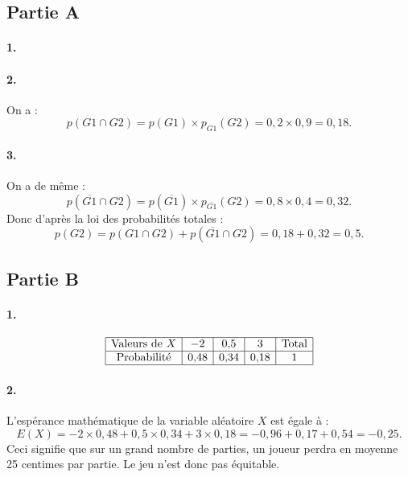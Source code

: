 \subsection*{Partie A}

\paragraph{1.}
\begin{center}
\end{center}

\paragraph{2.} On a :
\[
p(G1 \cap G2) = p(G1) \times p_{G1}(G2) = 0{,}2 \times 0{,}9 = 0{,}18.
\]

\paragraph{3.} On a de même :
\[
p(\overline{G1} \cap G2) = p(\overline{G1}) \times p_{\overline{G1}}(G2) = 0{,}8 \times 0{,}4 = 0{,}32.
\]
Donc d'après la loi des probabilités totales :
\[
p(G2) = p(G1 \cap G2) + p(\overline{G1} \cap G2) = 0{,}18 + 0{,}32 = 0{,}5.
\]

\subsection*{Partie B}

\paragraph{1.}
\[
\begin{array}{|c|c|c|c|c|}
\hline
\text{Valeurs de }X & -2 & 0{,}5 & 3 & \text{Total} \\
\hline
\text{Probabilité} & 0{,}48 & 0{,}34 & 0{,}18 & 1 \\
\hline
\end{array}
\]

\paragraph{2.}
L'espérance mathématique de la variable aléatoire \(X\) est égale à :
\[
E(X) = -2 \times 0{,}48 + 0{,}5 \times 0{,}34 + 3 \times 0{,}18 = -0{,}96 + 0{,}17 + 0{,}54 = -0{,}25.
\]
Ceci signifie que sur un grand nombre de parties, un joueur perdra en moyenne 25 centimes par partie. Le jeu n'est donc pas équitable.
